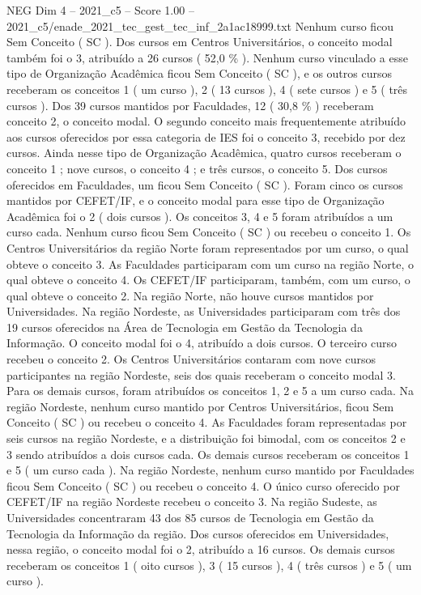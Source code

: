 \begin{textsample}{NEG Dim 4 – 2021\_c5 – Score 1.00 – 2021\_c5/enade\_2021\_tec\_gest\_tec\_inf\_2a1ac18999.txt}
Nenhum curso ficou Sem Conceito ( SC ).
Dos cursos em Centros Universitários, o conceito modal também foi o 3, atribuído a 26 cursos ( 52,0 \% ).
Nenhum curso vinculado a esse tipo de Organização Acadêmica ficou Sem Conceito ( SC ), e os outros cursos receberam os conceitos 1 ( um curso ), 2 ( 13 cursos ), 4 ( sete cursos ) e 5 ( três cursos ).
Dos 39 cursos mantidos por Faculdades, 12 ( 30,8 \% ) receberam conceito 2, o conceito modal.
O segundo conceito mais frequentemente atribuído aos cursos oferecidos por essa categoria de IES foi o conceito 3, recebido por dez cursos.
Ainda nesse tipo de Organização Acadêmica, quatro cursos receberam o conceito 1 ; nove cursos, o conceito 4 ; e três cursos, o conceito 5.
Dos cursos oferecidos em Faculdades, um ficou Sem Conceito ( SC ).
Foram cinco os cursos mantidos por CEFET/IF, e o conceito modal para esse tipo de Organização Acadêmica foi o 2 ( dois cursos ).
Os conceitos 3, 4 e 5 foram atribuídos a um curso cada.
Nenhum curso ficou Sem Conceito ( SC ) ou recebeu o conceito 1.
Os Centros Universitários da região Norte foram representados por um curso, o qual obteve o conceito 3.
As Faculdades participaram com um curso na região Norte, o qual obteve o conceito 4.
Os CEFET/IF participaram, também, com um curso, o qual obteve o conceito 2.
Na região Norte, não houve cursos mantidos por Universidades.
Na região Nordeste, as Universidades participaram com três dos 19 cursos oferecidos na Área de Tecnologia em Gestão da Tecnologia da Informação.
O conceito modal foi o 4, atribuído a dois cursos.
O terceiro curso recebeu o conceito 2.
Os Centros Universitários contaram com nove cursos participantes na região Nordeste, seis dos quais receberam o conceito modal 3.
Para os demais cursos, foram atribuídos os conceitos 1, 2 e 5 a um curso cada.
Na região Nordeste, nenhum curso mantido por Centros Universitários, ficou Sem Conceito ( SC ) ou recebeu o conceito 4.
As Faculdades foram representadas por seis cursos na região Nordeste, e a distribuição foi bimodal, com os conceitos 2 e 3 sendo atribuídos a dois cursos cada.
Os demais cursos receberam os conceitos 1 e 5 ( um curso cada ).
Na região Nordeste, nenhum curso mantido por Faculdades ficou Sem Conceito ( SC ) ou recebeu o conceito 4.
O único curso oferecido por CEFET/IF na região Nordeste recebeu o conceito 3.
Na região Sudeste, as Universidades concentraram 43 dos 85 cursos de Tecnologia em Gestão da Tecnologia da Informação da região.
Dos cursos oferecidos em Universidades, nessa região, o conceito modal foi o 2, atribuído a 16 cursos.
Os demais cursos receberam os conceitos 1 ( oito cursos ), 3 ( 15 cursos ), 4 ( três cursos ) e 5 ( um curso ).

\end{textsample}
